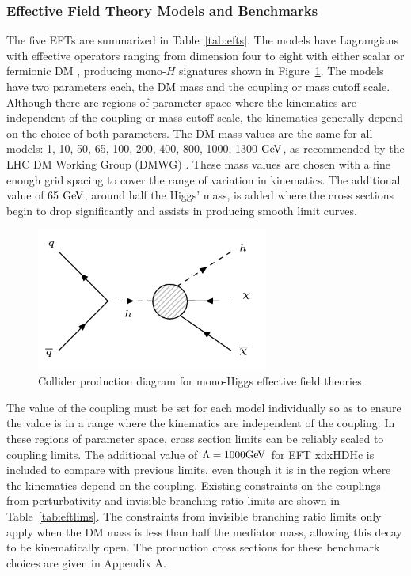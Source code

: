 \subsubsection{Effective Field Theory Models and Benchmarks}

The five EFTs are summarized in Table~\ref{tab:efts}. The models have Lagrangians with effective operators ranging from dimension four to eight with either scalar or fermionic DM \cite{McDonald:1993ex, LopezHonorez:2012kv}, producing mono-$H$ signatures shown in Figure~\ref{fig:eftsig}. The models have two parameters each, the DM mass and the coupling or mass cutoff scale. Although there are regions of parameter space where the kinematics are independent of the coupling or mass cutoff scale, the kinematics generally depend on the choice of both parameters. The DM mass values are the same for all models: 1, 10, 50, 65, 100, 200, 400, 800, 1000, 1300 $\mathrm{Ge\kern -0.1em V}$, as recommended by the LHC DM Working Group (DMWG) \cite{Abercrombie:2015wmb}. These mass values are chosen with a fine enough grid spacing to cover the range of variation in kinematics. The additional value of 65 $\mathrm{Ge\kern -0.1em V}$, around half the Higgs' mass, is added where the cross sections begin to drop significantly and assists in producing smooth limit curves.

\begin{figure}[tbh]
\centering
\includegraphics[width=3in]{figures/eftsig.png}
\caption{Collider production diagram for mono-Higgs effective field theories.}
\label{fig:eftsig}
\end{figure}

The value of the coupling must be set for each model individually so as to ensure the value is in a range where the kinematics are independent of the coupling. In these regions of parameter space, cross section limits can be reliably scaled to coupling limits. The additional value of $\Lambda = 1000 \mathrm{Ge\kern -0.1em V}$ for EFT$\_$xdxHDHc is included to compare with previous limits, even though it is in the region where the kinematics depend on the coupling. Existing constraints on the couplings from perturbativity \cite{Carpenter:2013xra} and invisible branching ratio limits \cite{Belanger:2013kya, PhysRevD.86.010001} are shown in Table~\ref{tab:eftlims}. The constraints from invisible branching ratio limits only apply when the DM mass is less than half the mediator mass, allowing this decay to be kinematically open. The production cross sections for these benchmark choices are given in Appendix A.

